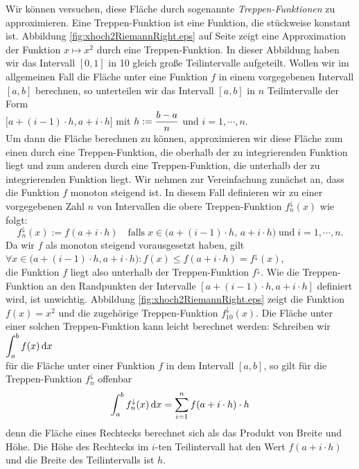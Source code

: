 Wir k\"onnen versuchen, diese Fl\"ache durch sogenannte
\emph{Treppen-Funktionen} zu approximieren.  Eine Treppen-Funktion ist eine Funktion, die
st\"uckweise konstant ist.  Abbildung \ref{fig:xhoch2RiemannRight.eps} auf Seite 
\pageref{fig:xhoch2RiemannRight.eps} zeigt eine Approximation der Funktion $x \mapsto x^2$
durch eine Treppen-Funktion.  In dieser Abbildung haben wir das Intervall $[0,1]$ in 10 gleich
gro{\ss}e Teilintervalle aufgeteilt.  Wollen wir im allgemeinen Fall die Fl\"ache unter eine
Funktion $f$ in einem vorgegebenen Intervall $[a,b]$ berechnen, so 
unterteilen wir das Intervall $[a,b]$ in $n$ Teilintervalle der Form 
\\[0.2cm]
\hspace*{1.3cm}
$\bigl[a + (i-1) \cdot  h, a + i\cdot h \bigr]$ \quad mit $\displaystyle h := \frac{b-a}{n}$ und $i=1,\cdots,n$.
\\[0.2cm]
Um dann die Fl\"ache berechnen zu k\"onnen, approximieren wir diese Fl\"ache
zum einen durch eine Treppen-Funktion, die oberhalb der zu integrierenden Funktion liegt und zum anderen durch eine
Treppen-Funktion, die unterhalb der zu integrierenden Funktion liegt.  Wir nehmen zur
Vereinfachung zun\"achst an, dass die Funktion $f$ monoton steigend ist.
In diesem Fall definieren wir zu einer vorgegebenen Zahl $n$ von Intervallen die obere
Treppen-Funktion $f^\downarrow_{n}(x)$ wie folgt:
\begin{equation}
  \label{eq:treppeOben}
  f^\downarrow_n(x) := f(a + i\cdot h) \quad \mbox{falls}\; 
  x \in  \bigl(a+(i-1)\cdot h,\, a+i\cdot h\bigr)\;\mbox{und}\;i=1,\cdots,n.
\end{equation}
Da wir $f$ als monoton steigend vorausgesetzt haben, gilt 
\\[0.2cm]
\hspace*{1.3cm}
$\forall x \in \bigl( a+(i-1)\cdot h, a+i\cdot h\bigr): f(x) \leq f(a+i\cdot h) = f^\downarrow(x)$,
\\[0.2cm]
die Funktion $f$ liegt also unterhalb der Treppen-Funktion $f^\downarrow$.
Wie die Treppen-Funktion an den Randpunkten der Intervalle $[a+(i-1)\cdot h, a+i\cdot h]$ definiert
wird, ist unwichtig.  Abbildung \ref{fig:xhoch2RiemannRight.eps} zeigt die Funktion 
$f(x) = x^2$ und die zugeh\"orige Treppen-Funktion $f^\downarrow_{10}(x)$.  Die Fl\"ache unter
einer solchen Treppen-Funktion kann leicht berechnet werden:  Schreiben wir
\\[0.2cm]
\hspace*{1.3cm}
$\displaystyle \int_a^b f(x) \,\textrm{d} x$
\\[0.2cm] 
f\"ur die Fl\"ache unter einer Funktion $f$ in dem Intervall $[a,b]$, so gilt f\"ur die
Treppen-Funktion $f^\downarrow_{n}$ offenbar
\begin{equation}
  \label{eq:intOber}
  \int_a^b f^\downarrow_n(x) \,\textrm{d} x = \sum\limits_{i=1}^n f(a+i\cdot h)\cdot h
\end{equation}
denn die Fl\"ache eines Rechtecks berechnet sich als das Produkt von Breite und H\"ohe.  Die
H\"ohe des Rechtecks im $i$-ten Teilintervall hat den Wert $f(a + i\cdot h)$ und die Breite
des Teilintervalls ist $h$.

